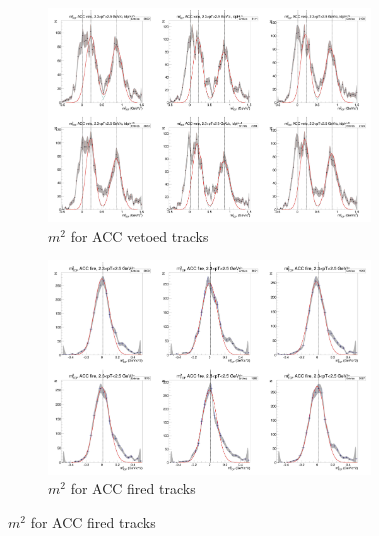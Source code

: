 \begin{figure}[H]
  \ContinuedFloat
    \begin{subfigure}{1\textwidth}
   \centering
   \includegraphics[width=0.94\textwidth]{hiptfits/neg/PSm2_cent0_ich0_accfire0_ptbin9.jpg}
    \caption{$m^2$ for ACC vetoed tracks}
    \end{subfigure}
    \begin{subfigure}{1\textwidth}
   \centering
   \includegraphics[width=0.94\textwidth]{hiptfits/neg/PSm2_cent0_ich0_accfire1_ptbin9.jpg}
    \caption{$m^2$ for ACC fired tracks}
    \end{subfigure}  
\end{figure}
